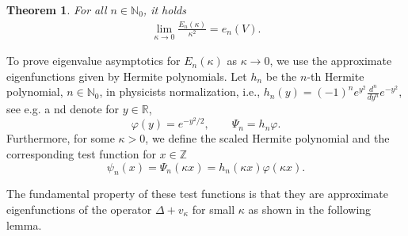 \documentclass[12pt, reqno]{amsart}
\newtheorem{theorem}{Theorem}[section]
\theoremstyle{definition}
\numberwithin{equation}{section}
\newcommand{\Z}{{\mathbb Z}}
\newcommand{\R}{{\mathbb R}}
\newcommand{\N}{{\mathbb N}}
\begin{document}
\begin{theorem}\label{thm:eigenvalue_asymptotics_harmonic_oscillator}
    For all $n\in \mathbb{N}_0$, it holds
    \begin{align*}
        \lim_{\kappa\to 0} \frac{E_n(\kappa)}{\kappa^2} = e_n(V).
    \end{align*}
\end{theorem}

To prove eigenvalue asymptotics for $E_n(\kappa)$ as $\kappa\to 0$, we use the approximate eigenfunctions given by Hermite polynomials. 
Let $h_n$ be the $n$-th Hermite polynomial, $n\in\N_0$, in physicists normalization, i.e., $ h_{n}(y)=(-1)^{n}e^{y^{2}}{\frac {d^{n}}{dy^{n}}}e^{-y^{2}}$, see e.g. \cite[Chapter~22]{Abramowitz_Stegun_72}a nd denote for $y\in \R$,
$$\varphi(y)=e^{-y^2/2},\qquad \Psi_n=h_n\varphi.$$
Furthermore,  for some $\kappa>0$, we define the scaled Hermite polynomial and the corresponding test function  for  $x\in \Z$  
$$\psi_{n}(x)=\Psi_n(\kappa x)=h_{n}(\kappa x)\varphi(\kappa x).$$

The fundamental property of these test functions is that they are approximate eigenfunctions of the operator $\Delta + v_\kappa$ for small $\kappa$ as shown in the following lemma.
\end{document}
